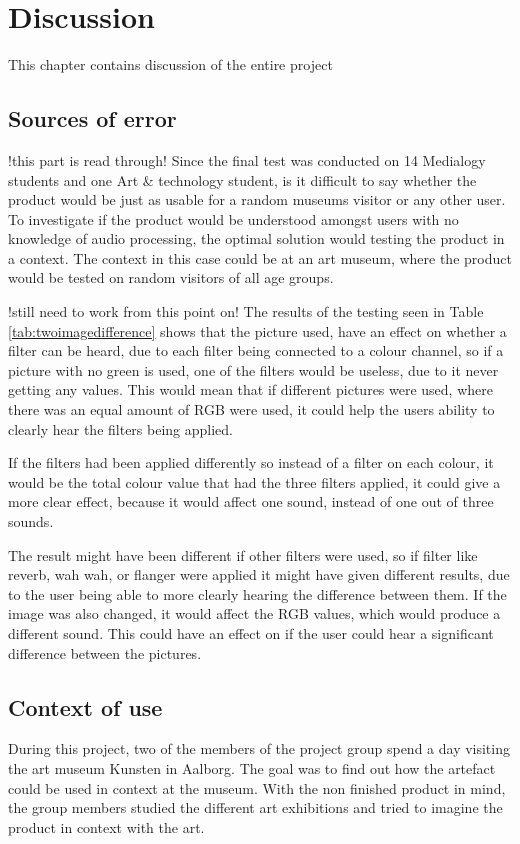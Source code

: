 \chapter{Discussion}\label{ch:discussion}
This chapter contains discussion of the entire project 

\section{Sources of error}
!this part is read through!
Since the final test was conducted on 14 Medialogy students and one Art \& technology student, is it difficult to say whether the product would be just as usable for a random museums visitor or any other user. To investigate if the product would be understood amongst users with no knowledge of audio processing, the optimal solution would testing the product in a context. The context in this case could be at an art museum, where the product would be tested on random visitors of all age groups.

!still need to work from this point on!
The results of the testing seen in Table \ref{tab:twoimagedifference} shows that the picture used, have an effect on whether a filter can be heard, due to each filter being connected to a colour channel, so if a picture with no green is used, one of the filters would be useless, due to it never getting any values. This would mean that if different pictures were used, where there was an equal amount of RGB were used, it could help the users ability to clearly hear the filters being applied. 
   
If the filters had been applied differently so instead of a filter on each colour, it would be the total colour value that had the three filters applied, it could give a more clear effect, because it would affect one sound, instead of one out of three sounds. 
 
The result might have been different if other filters were used, so if filter like reverb, wah wah, or flanger were applied it might have given different results, due to the user being able to more clearly hearing the difference between them. If the image was also changed, it would affect the RGB values, which would produce a different sound. This could have an effect on if the user could hear a significant difference between the pictures.

 
 
 \section{Context of use}
During this project, two of the members of the project group spend a day visiting the art museum Kunsten in Aalborg. The goal was to find out how the artefact could be used in context at the museum. With the non finished product in mind, the group members studied the different art exhibitions and tried to imagine the product in context with the art. 


